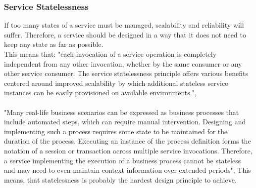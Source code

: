 \documentclass[12pt]{article}
\begin{document}
\subsubsection{Service Statelessness}
If too many states of a service must be managed, scalability and reliability will suffer. Therefore, a service should be designed in a way that it does not need to keep any state as far as possible. \cite[page 88]{te}\\
This means that: "each invocation of a service operation is completely independent from any other invocation, whether by the same consumer or any other service consumer. The service statelessness principle offers various benefits centered around improved scalability by which additional stateless service instances can be easily provisioned on available environments.", \cite[page 197]{grau}\\
\\
"Many real-life business scenarios can be expressed as business processes that include automated steps, which can require manual intervention. Designing and implementing such a process requires some state to be maintained for the duration of the process. Executing an instance of the process definition forms the notation of a session or transaction across multiple service invocations. Therefore, a service implementing the execution of a business process cannot be stateless and may need to even maintain context information over extended periods",\cite[page 197]{grau} This means, that statelessness is probably the hardest design principle to achieve.
\end{document}
